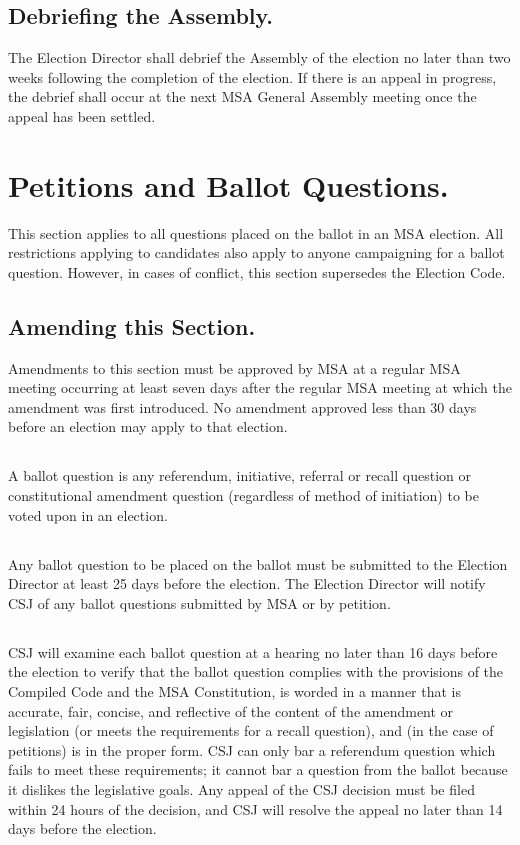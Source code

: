 \subsection{Debriefing the Assembly.}
The Election Director shall debrief the Assembly of the election no later than two weeks following the completion of the election. If there is an appeal in progress, the debrief shall occur at the next MSA General Assembly meeting once the appeal has been settled.


\section{Petitions and Ballot Questions.}
This section applies to all questions placed on the ballot in an MSA election.  All restrictions applying to candidates also apply to anyone campaigning for a ballot question.  However, in cases of conflict, this section supersedes the Election Code.

\subsection{Amending this Section.}
Amendments to this section must be approved by MSA at a regular MSA meeting occurring at least seven days after the regular MSA meeting at which the amendment was first introduced.  No amendment approved less than 30 days before an election may apply to that election.

\subsection{}
A ballot question is any referendum, initiative, referral or recall question or constitutional amendment question (regardless of method of initiation) to be voted upon in an election.

\subsection{}
Any ballot question to be placed on the ballot must be submitted to the Election Director at least 25 days before the election.  The Election Director will notify CSJ of any ballot questions submitted by MSA or by petition.  

\subsection{}
CSJ will examine each ballot question at a hearing no later than 16 days before the election to verify that the ballot question complies with the provisions of the Compiled Code and the MSA Constitution, is worded in a manner that is accurate, fair, concise, and reflective of the content of the amendment or legislation (or meets the requirements for a recall question), and (in the case of petitions) is in the proper form. CSJ can only bar a referendum question which fails to meet these requirements; it cannot bar a question from the ballot because it dislikes the legislative goals. Any appeal of the CSJ decision must be filed within 24 hours of the decision, and CSJ will resolve the appeal no later than 14 days before the election.


